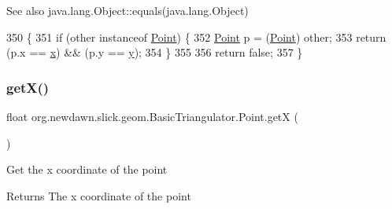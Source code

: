 \begin{DoxySeeAlso}{See also}
java.\+lang.\+Object\+::equals(java.\+lang.\+Object) 
\end{DoxySeeAlso}

\begin{DoxyCode}
350                                             \{
351             \textcolor{keywordflow}{if} (other instanceof \mbox{\hyperlink{classorg_1_1newdawn_1_1slick_1_1geom_1_1_basic_triangulator_1_1_point_aece21dc99059c02dceef8a70eb47d4cc}{Point}}) \{
352                 \mbox{\hyperlink{classorg_1_1newdawn_1_1slick_1_1geom_1_1_basic_triangulator_1_1_point_aece21dc99059c02dceef8a70eb47d4cc}{Point}} p = (\mbox{\hyperlink{classorg_1_1newdawn_1_1slick_1_1geom_1_1_basic_triangulator_1_1_point_aece21dc99059c02dceef8a70eb47d4cc}{Point}}) other;
353                 \textcolor{keywordflow}{return} (p.x == \mbox{\hyperlink{classorg_1_1newdawn_1_1slick_1_1geom_1_1_basic_triangulator_1_1_point_a430d2074970ce9d8248e998f45e0deac}{x}}) && (p.y == \mbox{\hyperlink{classorg_1_1newdawn_1_1slick_1_1geom_1_1_basic_triangulator_1_1_point_aad601993c7f613bd1e26c48a62a950d7}{y}});
354             \}
355             
356             \textcolor{keywordflow}{return} \textcolor{keyword}{false};
357         \}
\end{DoxyCode}
\mbox{\label{classorg_1_1newdawn_1_1slick_1_1geom_1_1_basic_triangulator_1_1_point_aeaef6b66057505fbb785e9e0bee90c25}} 
\subsubsection{\texorpdfstring{get\+X()}{getX()}}
{\footnotesize\ttfamily float org.\+newdawn.\+slick.\+geom.\+Basic\+Triangulator.\+Point.\+getX (\begin{DoxyParamCaption}{ }\end{DoxyParamCaption})\hspace{0.3cm}{\ttfamily [inline]}}

Get the x coordinate of the point

\begin{DoxyReturn}{Returns}
The x coordinate of the point 
\end{DoxyReturn}

